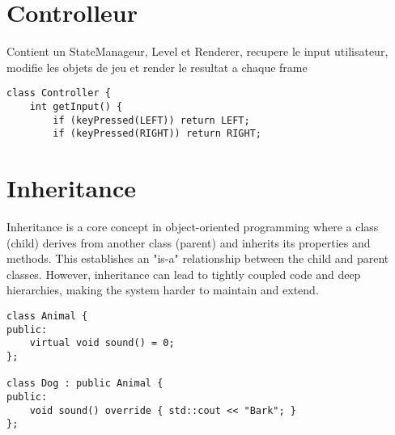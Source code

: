 \documentclass{article}
\begin{document}
\section{Controlleur}
Contient un StateManageur, Level et Renderer, recupere le input utilisateur, modifie les objets de jeu et render le resultat a chaque frame

\begin{center}
    \begin{minipage}[c]{0.5\textwidth}
        \begin{verbatim}
class Controller {
    int getInput() {
        if (keyPressed(LEFT)) return LEFT;
        if (keyPressed(RIGHT)) return RIGHT;
        \end{verbatim}
    \end{minipage}
\end{center}

\section{Inheritance}
Inheritance is a core concept in object-oriented programming where a class (child) derives from another class (parent) and inherits its properties and methods. This establishes an "is-a" relationship between the child and parent classes. However, inheritance can lead to tightly coupled code and deep hierarchies, making the system harder to maintain and extend.

\begin{center}
    \begin{minipage}[c]{0.5\textwidth}
        \begin{verbatim}
class Animal {
public:
    virtual void sound() = 0;
};

class Dog : public Animal {
public:
    void sound() override { std::cout << "Bark"; }
};
        \end{verbatim}
    \end{minipage}
\end{center}
\end{document}
